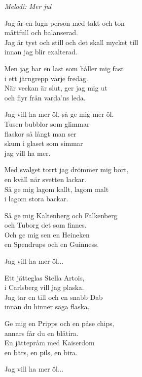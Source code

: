 {\footnotesize\textit{Melodi: Mer jul}}\par
\vspace{10pt}
Jag är en lugn person med takt och ton\\
måttfull och balanserad.\\
Jag är tyst och still och det skall mycket till\\
innan jag blir exalterad.\par
\vspace{10pt}
Men jag har en last som håller mig fast\\
i ett järngrepp varje fredag.\\
När veckan är slut, ger jag mig ut\\
och flyr från varda’ns leda.\par
\vspace{10pt}
\revrpt Jag vill ha mer öl, så ge mig mer öl.\rpt\\
Tusen bubblor som glimmar\\
flaskor så långt man ser\\
skum i glaset som simmar\\
jag vill ha mer.\par
\vspace{10pt}
Med svalget torrt jag drömmer mig bort,\\
en kväll när svetten lackar.\\
Så ge mig lagom kallt, lagom malt\\
i lagom stora backar.\par
\vspace{10pt}
Så ge mig Kaltenberg och Falkenberg\\
och Tuborg det som finnes.\\
Och ge mig sen en Heineken\\
en Spendrups och en Guinness.\par
\vspace{10pt}
Jag vill ha mer öl...\par
\vspace{10pt}
Ett jätteglas Stella Artois,\\
i Carlsberg vill jag plaska.\\
Jag tar en till och en snabb Dab\\
innan du hinner säga flaska.\par
\vspace{10pt}
Ge mig en Pripps och en påse chips,\\
annars får du en blåtira.\\
En jättepråm med Kaiserdom\\
en bärs, en pils, en bira.\par
\vspace{10pt}
Jag vill ha mer öl...
